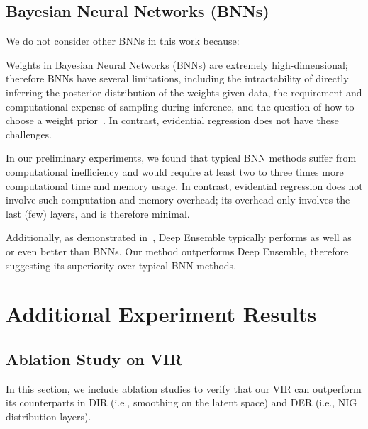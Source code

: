 \subsection{Bayesian Neural Networks (BNNs)}
We do not consider other BNNs in this work because:
\begin{compactitem}
\item Weights in Bayesian Neural Networks (BNNs) are extremely high-dimensional; therefore BNNs have several limitations, including the intractability of directly inferring the posterior distribution of the weights given data, the requirement and computational expense of sampling during inference, and the question of how to choose a weight prior~\citep{DER}. In contrast, evidential regression does not have these challenges.
\item In our preliminary experiments, we found that typical BNN methods suffer from computational inefficiency and would require at least two to three times more computational time and memory usage. In contrast, evidential regression does not involve such computation and memory overhead; its overhead only involves the last (few) layers, and is therefore minimal.
\item {Additionally, as demonstrated in~\citep{DeepEnsemble}, Deep Ensemble typically performs as well as or even better than BNNs. Our method outperforms Deep Ensemble, therefore suggesting its superiority over typical BNN methods.}
\end{compactitem}

\section{Additional Experiment Results}

\subsection{Ablation Study on VIR} 
In this section, we include ablation studies to verify that our VIR can outperform its counterparts in DIR (i.e., smoothing on the latent space) and DER (i.e., NIG distribution layers).

